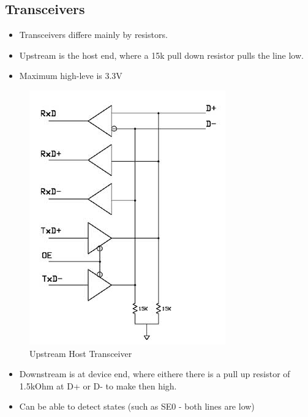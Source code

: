 \documentclass{article}
\begin{document}
\subsection{Transceivers}
\begin{itemize}
    \item Transceivers differe mainly by resistors.
    \item Upstream is the host end, where a 15k pull down resistor pulls the line low.
    \item Maximum high-leve is 3.3V
\end{itemize}
\begin{figure}[H]
    \begin{center}
        \includegraphics[scale=0.5]{DocuResources/TransceiversUp.jpg}
        \caption{Upstream Host Transceiver}
    \end{center}
\end{figure}
\begin{itemize}
    \item Downstream is at device end, where eithere there is a pull up resistor of 1.5kOhm at D+ or D- to make then high.
    \item Can be able to detect states (such as SE0 - both lines are low)
\end{itemize}
\end{document}

